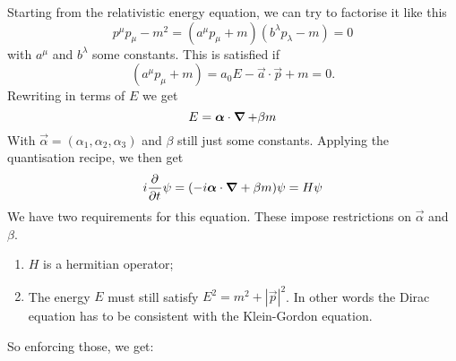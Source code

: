 Starting from the relativistic energy equation, we can try to factorise it like this
\[ p^\mu p_\mu - m^2 =  (a^\mu p_\mu + m)(b^\lambda p_\lambda - m) = 0 \]
with $a^\mu$ and $b^\lambda$ some constants. This is satisfied if
\[(a^\mu p_\mu + m) = a_0 E - \vec{a}\cdot \vec{p} + m = 0.\]
Rewriting in terms of $E$ we get
\[ E = \bm{\mathrm{\alpha}}\cdot\operatorname{\bm{\mathrm{\nabla}}}+ \beta m \]
With $\vec{\alpha} = (\alpha_1,\alpha_2,\alpha_3)$ and $\beta$ still just some constants.
Applying the quantisation recipe, we then get
\[ i  \frac{\partial{^{}}}{\partial{{t}^{}}} \psi = (-i \bm{\mathrm{\alpha}}\cdot\bm{\mathrm{\nabla}}+ \beta m)\psi = H\psi \]
We have two requirements for this equation. These impose restrictions on $\vec{\alpha}$ and $\beta$.
\begin{enumerate}
\item $H$ is a hermitian operator;
\item The energy $E$ must still satisfy $E^2 = m^2 + |\vec{p}|^2$. In other words the Dirac equation has to be consistent with the Klein-Gordon equation.
\end{enumerate}
So enforcing those, we get:
